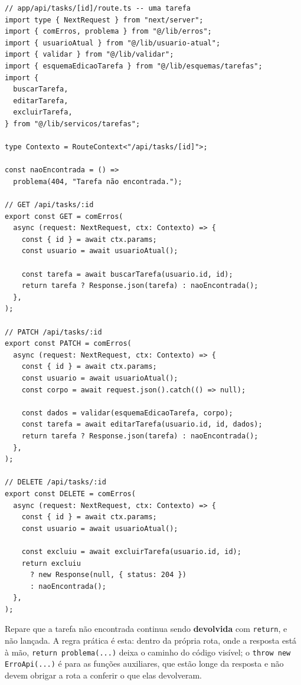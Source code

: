 \begin{codigo}
\begin{Verbatim}[breaklines=true, breaksymbolleft={}, fontsize=\footnotesize]
// app/api/tasks/[id]/route.ts -- uma tarefa
import type { NextRequest } from "next/server";
import { comErros, problema } from "@/lib/erros";
import { usuarioAtual } from "@/lib/usuario-atual";
import { validar } from "@/lib/validar";
import { esquemaEdicaoTarefa } from "@/lib/esquemas/tarefas";
import {
  buscarTarefa,
  editarTarefa,
  excluirTarefa,
} from "@/lib/servicos/tarefas";

type Contexto = RouteContext<"/api/tasks/[id]">;

const naoEncontrada = () =>
  problema(404, "Tarefa não encontrada.");

// GET /api/tasks/:id
export const GET = comErros(
  async (request: NextRequest, ctx: Contexto) => {
    const { id } = await ctx.params;
    const usuario = await usuarioAtual();

    const tarefa = await buscarTarefa(usuario.id, id);
    return tarefa ? Response.json(tarefa) : naoEncontrada();
  },
);

// PATCH /api/tasks/:id
export const PATCH = comErros(
  async (request: NextRequest, ctx: Contexto) => {
    const { id } = await ctx.params;
    const usuario = await usuarioAtual();
    const corpo = await request.json().catch(() => null);

    const dados = validar(esquemaEdicaoTarefa, corpo);
    const tarefa = await editarTarefa(usuario.id, id, dados);
    return tarefa ? Response.json(tarefa) : naoEncontrada();
  },
);

// DELETE /api/tasks/:id
export const DELETE = comErros(
  async (request: NextRequest, ctx: Contexto) => {
    const { id } = await ctx.params;
    const usuario = await usuarioAtual();

    const excluiu = await excluirTarefa(usuario.id, id);
    return excluiu
      ? new Response(null, { status: 204 })
      : naoEncontrada();
  },
);
\end{Verbatim}
\end{codigo}

Repare que a tarefa não encontrada continua sendo \textbf{devolvida} com \texttt{return}, e não lançada. A regra prática é esta: dentro da própria rota, onde a resposta está à mão, \texttt{return problema(...)} deixa o caminho do código visível; o \texttt{throw new ErroApi(...)} é para as funções auxiliares, que estão longe da resposta e não devem obrigar a rota a conferir o que elas devolveram.

